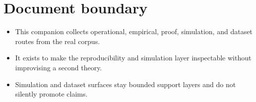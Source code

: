 \section*{Document boundary}
\begin{itemize}[leftmargin=*]
\item This companion collects operational, empirical, proof, simulation, and dataset routes from the real corpus.
\item It exists to make the reproducibility and simulation layer inspectable without improvising a second theory.
\item Simulation and dataset surfaces stay bounded support layers and do not silently promote claims.
\end{itemize}
